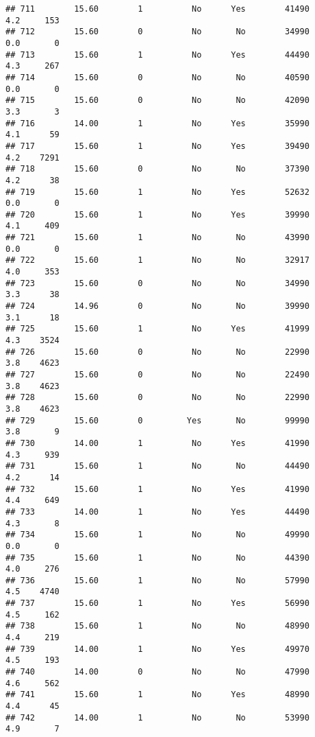\documentclass[
]{article}
\begin{document}
\begin{verbatim}
## 711        15.60        1          No      Yes        41490         4.2     153
## 712        15.60        0          No       No        34990         0.0       0
## 713        15.60        1          No      Yes        44490         4.3     267
## 714        15.60        0          No       No        40590         0.0       0
## 715        15.60        0          No       No        42090         3.3       3
## 716        14.00        1          No      Yes        35990         4.1      59
## 717        15.60        1          No      Yes        39490         4.2    7291
## 718        15.60        0          No       No        37390         4.2      38
## 719        15.60        1          No      Yes        52632         0.0       0
## 720        15.60        1          No      Yes        39990         4.1     409
## 721        15.60        1          No       No        43990         0.0       0
## 722        15.60        1          No       No        32917         4.0     353
## 723        15.60        0          No       No        34990         3.3      38
## 724        14.96        0          No       No        39990         3.1      18
## 725        15.60        1          No      Yes        41999         4.3    3524
## 726        15.60        0          No       No        22990         3.8    4623
## 727        15.60        0          No       No        22490         3.8    4623
## 728        15.60        0          No       No        22990         3.8    4623
## 729        15.60        0         Yes       No        99990         3.8       9
## 730        14.00        1          No      Yes        41990         4.3     939
## 731        15.60        1          No       No        44490         4.2      14
## 732        15.60        1          No      Yes        41990         4.4     649
## 733        14.00        1          No      Yes        44490         4.3       8
## 734        15.60        1          No       No        49990         0.0       0
## 735        15.60        1          No       No        44390         4.0     276
## 736        15.60        1          No       No        57990         4.5    4740
## 737        15.60        1          No      Yes        56990         4.5     162
## 738        15.60        1          No       No        48990         4.4     219
## 739        14.00        1          No      Yes        49970         4.5     193
## 740        14.00        0          No       No        47990         4.6     562
## 741        15.60        1          No      Yes        48990         4.4      45
## 742        14.00        1          No       No        53990         4.9       7

\end{verbatim}
\end{document}
